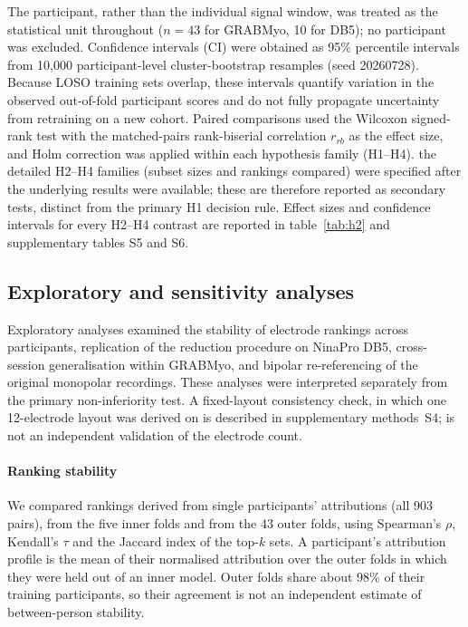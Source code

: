 The participant, rather than the individual signal window, was treated as the statistical unit throughout ($n = 43$ for GRABMyo, 10 for DB5); no participant was excluded. Confidence intervals (CI) were obtained as 95\% percentile intervals from 10,000 participant-level cluster-bootstrap resamples (seed 20260728). Because LOSO training sets overlap, these intervals quantify variation in the observed out-of-fold participant scores and do not fully propagate uncertainty from retraining on a new cohort. Paired comparisons used the Wilcoxon signed-rank test with the matched-pairs rank-biserial correlation $r_{rb}$ as the effect size, and Holm correction was applied within each hypothesis family (H1--H4).  the detailed H2--H4 families (subset sizes and rankings compared) were specified after the underlying results were available; these are therefore reported as secondary tests, distinct from the primary H1 decision rule. Effect sizes and confidence intervals for every H2--H4 contrast are reported in table~\ref{tab:h2} and supplementary tables S5 and S6. 

\subsection[Exploratory and sensitivity analyses]{Exploratory and sensitivity analyses}
\label{sec:exploratory}

Exploratory analyses examined the stability of electrode rankings across participants, replication of the reduction procedure on NinaPro DB5, cross-session generalisation within GRABMyo, and bipolar re-referencing of the original monopolar recordings. These analyses were interpreted separately from the primary non-inferiority test. A fixed-layout consistency check, in which one 12-electrode layout was derived on  is described in supplementary methods~S4;  is not an independent validation of the electrode count.

\paragraph{Ranking stability} We compared rankings derived from single participants' attributions (all 903 pairs), from the five inner folds and from the 43 outer folds, using Spearman's $\rho$, Kendall's $\tau$ and the Jaccard index of the top-$k$ sets. A participant's attribution profile is the mean of their normalised attribution over the outer folds in which they were held out of an inner model. Outer folds share about 98\% of their training participants, so their agreement is not an independent estimate of between-person stability.

